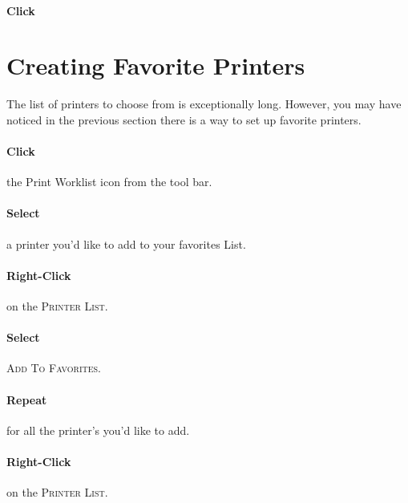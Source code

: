 
\paragraph{Click} 


\section{Creating Favorite Printers}
The list of printers to choose from is exceptionally long. However, you may have noticed in the previous section there is a way to set up favorite printers.

\paragraph{Click} the Print Worklist  icon from the tool bar.\\


\paragraph{Select} a printer you'd like to add to your favorites List.

\paragraph{Right-Click} on the \textsc{Printer List}.

\paragraph{Select} \textsc{Add To Favorites}.\\


\paragraph{Repeat} for all the printer's you'd like to add.

\paragraph{Right-Click} on the \textsc{Printer List}.

